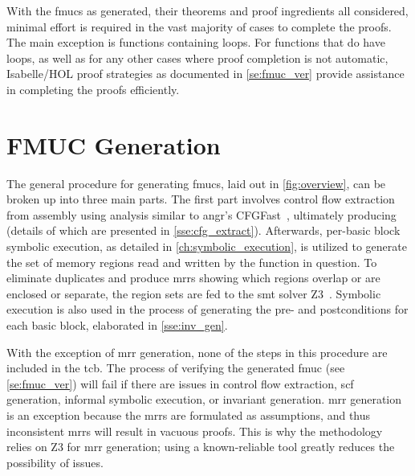With the \acp{fmuc} as generated, their theorems and proof ingredients all considered,
minimal effort is required in the vast majority of cases to complete the proofs.
The main exception is functions containing loops.
For functions that do have loops,
as well as for any other cases where proof completion is not automatic,
Isabelle/HOL proof strategies as documented in \cref{se:fmuc_ver}
provide assistance in completing the proofs efficiently.

\section{FMUC Generation}\label{se:fmuc_gen}
\begin{figure*}
  \centering
  \caption{\acs*{fmuc} overview}\label{fig:overview}
\end{figure*}

The general procedure for generating \acp{fmuc}, laid out in \cref{fig:overview},
can be broken up into three main parts.
The first part involves control flow extraction from assembly using  analysis
similar to angr's CFGFast~\citep{shoshitaishvili2016state},%
ultimately producing  (details of which are presented
in \cref{sse:cfg_extract}).
Afterwards, per-basic block symbolic execution,
as detailed in \cref{ch:symbolic_execution},
is utilized to generate the set of memory regions
read and written by the function in question.
To eliminate duplicates and produce \acp{mrr}
showing which regions overlap or are enclosed or separate,
the region sets are fed to the \ac{smt} solver Z3~\citep{de2008z3}.
Symbolic execution is also used in the process of generating
the pre- and postconditions for each basic block,
elaborated in \cref{sse:inv_gen}.

With the exception of \ac{mrr} generation,
none of the steps in this procedure are included in the \ac{tcb}.
The process of verifying the generated \ac{fmuc} (see \cref{se:fmuc_ver})
will fail if there are issues in control flow extraction,
\ac{scf} generation, informal symbolic execution, or invariant generation.
\Ac{mrr} generation is an exception
because the \acp{mrr} are formulated as assumptions,
and thus inconsistent \acp{mrr} will result in vacuous proofs.
This is why the methodology relies on Z3 for \ac{mrr} generation;
using a known-reliable tool greatly reduces the possibility of issues.

